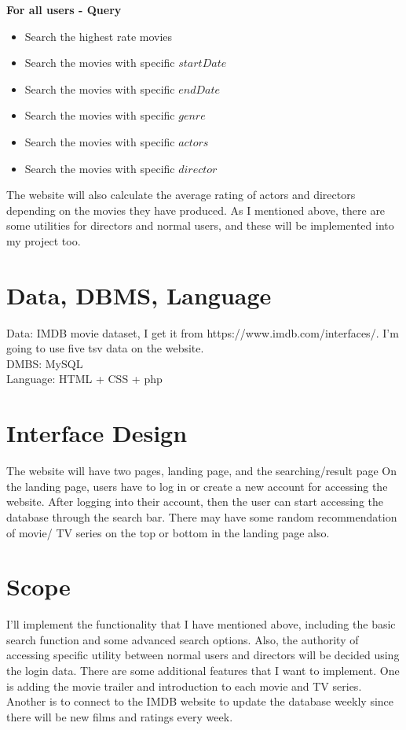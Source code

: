 \documentclass[11pt]{article}
\begin{document}
\textbf{For all users - Query}
\begin{itemize}
    \item Search the highest rate movies \\
    \item Search the movies with specific $startDate$ \\
    \item Search the movies with specific $endDate$ \\
    \item Search the movies with specific $genre$ \\
    \item Search the movies with specific $actors$  \\
    \item Search the movies with specific $director$ \\
    
\end{itemize}
The website will also calculate the average rating of actors and directors depending on the movies they have produced. As I mentioned above, there are some utilities for directors and normal users, and these will be implemented into my project too.

\section{Data, DBMS, Language}
Data: IMDB movie dataset, I get it from https://www.imdb.com/interfaces/. 
I'm going to use five tsv data on the website.\\ 
DMBS: MySQL\\ 
Language: HTML + CSS + php

\section{Interface Design}
The website will have two pages, landing page, and the searching/result page
On the landing page, users have to log in or create a new account for accessing the website.
After logging into their account, then the user can start accessing the database through the search bar. There may have some random recommendation of 
movie/ TV series on the top or bottom in the landing page also.

\section{Scope}
I'll implement the functionality that I have mentioned above, 
including the basic search function and some advanced search options. Also, 
the authority of accessing specific utility between normal users and directors 
will be decided using the login data. There are some additional features that I want to implement. 
One is adding the movie trailer and introduction to each movie and TV series. 
Another is to connect to the IMDB website to update the database weekly since there will be new 
films and ratings every week.
\end{document}
